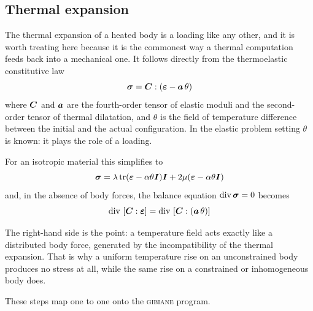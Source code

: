 \subsection{Thermal expansion}

%
%
The thermal expansion of a heated body is a loading like any other, and it is
worth treating here because it is the commonest way a thermal computation
feeds back into a mechanical one. It follows directly from the thermoelastic
constitutive law
\begin{equation}
  \bm{\sigma} = \bm{C} : \left( \bm{\varepsilon} - \bm{a}\,\theta \right)
\label{eq:elas:thermoelastic}
\end{equation}
where $\bm{C}$ and $\bm{a}$ are the fourth-order tensor of elastic moduli
and the second-order tensor of thermal dilatation, and $\theta$ is the field of
temperature difference between the initial and the actual configuration. In the
elastic problem setting $\theta$ is known: it plays the role of a loading.

For an isotropic material this simplifies to
\begin{equation}
  \bm{\sigma} = \lambda \operatorname{tr} (\bm{\varepsilon} - \alpha \theta \bm{I}) \bm{I}
   + 2 \mu (\bm{\varepsilon} - \alpha \theta \bm{I})
\end{equation}
and, in the absence of body forces, the balance equation
$\text{div}\, \bm{\sigma} = 0$ becomes
\begin{equation}
   \text{div}\, \left[ \bm{C} : \bm{\varepsilon} \right]
   = \text{div}\, \left[ \bm{C} : \left( \bm{a}\,\theta \right) \right]
\end{equation}

\noindent The right-hand side is the point: a temperature field acts exactly
like a distributed body force, generated by the incompatibility of the thermal
expansion. That is why a uniform temperature rise on an unconstrained body
produces no stress at all, while the same rise on a constrained or
inhomogeneous body does.

These steps map one to one onto the \textsc{gibiane} program.

